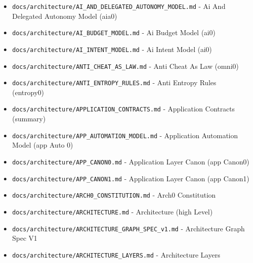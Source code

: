 \documentclass[10.5pt,a4paper,openany]{book}
\begin{document}
\begin{itemize}
\item \texttt{docs/\allowbreak{}architecture/\allowbreak{}AI\_\allowbreak{}AND\_\allowbreak{}DELEGATED\_\allowbreak{}AUTONOMY\_\allowbreak{}MODEL.\allowbreak{}md} -\allowbreak{} Ai And Delegated Autonomy Model (aia0)
\item \texttt{docs/\allowbreak{}architecture/\allowbreak{}AI\_\allowbreak{}BUDGET\_\allowbreak{}MODEL.\allowbreak{}md} -\allowbreak{} Ai Budget Model (ai0)
\item \texttt{docs/\allowbreak{}architecture/\allowbreak{}AI\_\allowbreak{}INTENT\_\allowbreak{}MODEL.\allowbreak{}md} -\allowbreak{} Ai Intent Model (ai0)
\item \texttt{docs/\allowbreak{}architecture/\allowbreak{}ANTI\_\allowbreak{}CHEAT\_\allowbreak{}AS\_\allowbreak{}LAW.\allowbreak{}md} -\allowbreak{} Anti Cheat As Law (omni0)
\item \texttt{docs/\allowbreak{}architecture/\allowbreak{}ANTI\_\allowbreak{}ENTROPY\_\allowbreak{}RULES.\allowbreak{}md} -\allowbreak{} Anti Entropy Rules (entropy0)
\item \texttt{docs/\allowbreak{}architecture/\allowbreak{}APPLICATION\_\allowbreak{}CONTRACTS.\allowbreak{}md} -\allowbreak{} Application Contracts (summary)
\item \texttt{docs/\allowbreak{}architecture/\allowbreak{}APP\_\allowbreak{}AUTOMATION\_\allowbreak{}MODEL.\allowbreak{}md} -\allowbreak{} Application Automation Model (app Auto 0)
\item \texttt{docs/\allowbreak{}architecture/\allowbreak{}APP\_\allowbreak{}CANON0.\allowbreak{}md} -\allowbreak{} Application Layer Canon (app Canon0)
\item \texttt{docs/\allowbreak{}architecture/\allowbreak{}APP\_\allowbreak{}CANON1.\allowbreak{}md} -\allowbreak{} Application Layer Canon (app Canon1)
\item \texttt{docs/\allowbreak{}architecture/\allowbreak{}ARCH0\_\allowbreak{}CONSTITUTION.\allowbreak{}md} -\allowbreak{} Arch0 Constitution
\item \texttt{docs/\allowbreak{}architecture/\allowbreak{}ARCHITECTURE.\allowbreak{}md} -\allowbreak{} Architecture (high Level)
\item \texttt{docs/\allowbreak{}architecture/\allowbreak{}ARCHITECTURE\_\allowbreak{}GRAPH\_\allowbreak{}SPEC\_\allowbreak{}v1.\allowbreak{}md} -\allowbreak{} Architecture Graph Spec V1
\item \texttt{docs/\allowbreak{}architecture/\allowbreak{}ARCHITECTURE\_\allowbreak{}LAYERS.\allowbreak{}md} -\allowbreak{} Architecture Layers

\end{itemize}
\end{document}
